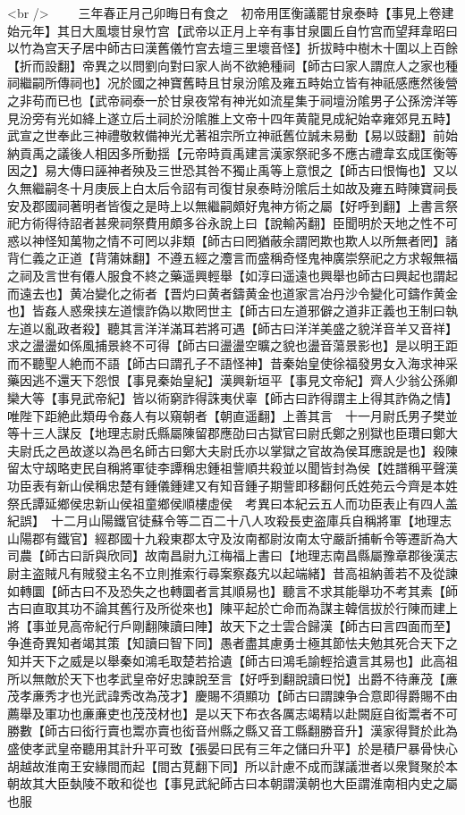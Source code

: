<br />
　　三年春正月己卯晦日有食之　初帝用匡衡議罷甘泉泰畤【事見上卷建始元年】其日大風壞甘泉竹宫【武帝以正月上辛有事甘泉圜丘自竹宫而望拜韋昭曰以竹為宫天子居中師古曰漢舊儀竹宫去壇三里壞音怪】折拔畤中樹木十圍以上百餘【折而設翻】帝異之以問劉向對曰家人尚不欲絶種祠【師古曰家人謂庶人之家也種祠繼嗣所傳祠也】况於國之神寶舊畤且甘泉汾隂及雍五畤始立皆有神祇感應然後營之非苟而已也【武帝祠泰一於甘泉夜常有神光如流星集于祠壇汾隂男子公孫滂洋等見汾旁有光如絳上遂立后土祠於汾隂脽上文帝十四年黄龍見成紀始幸雍郊見五畤】武宣之世奉此三神禮敬敕備神光尤著祖宗所立神祇舊位誠未易動【易以豉翻】前始納貢禹之議後人相因多所動揺【元帝時貢禹建言漢家祭祀多不應古禮韋玄成匡衡等因之】易大傳曰誣神者殃及三世恐其咎不獨止禹等上意恨之【師古曰恨悔也】又以久無繼嗣冬十月庚辰上白太后令詔有司復甘泉泰畤汾隂后土如故及雍五畤陳寶祠長安及郡國祠著明者皆復之是時上以無繼嗣頗好鬼神方術之屬【好呼到翻】上書言祭祀方術得待詔者甚衆祠祭費用頗多谷永說上曰【說輸芮翻】臣聞明於天地之性不可惑以神怪知萬物之情不可罔以非類【師古曰罔猶蔽余謂罔欺也欺人以所無者罔】諸背仁義之正道【背蒲妺翻】不遵五經之灋言而盛稱奇怪鬼神廣崇祭祀之方求報無福之祠及言世有僊人服食不終之藥遥興輕舉【如淳曰遥遠也興舉也師古曰興起也謂起而遠去也】黄冶變化之術者【晋灼曰黄者鑄黄金也道家言冶丹沙令變化可鑄作黄金也】皆姦人惑衆挟左道懷詐偽以欺罔世主【師古曰左道邪僻之道非正義也王制曰執左道以亂政者殺】聽其言洋洋滿耳若將可遇【師古曰洋洋美盛之貌洋音羊又音祥】求之盪盪如係風捕景終不可得【師古曰盪盪空曠之貌也盪音蕩景影也】是以明王距而不聽聖人絶而不語【師古曰謂孔子不語怪神】昔秦始皇使徐福發男女入海求神采藥因逃不還天下怨恨【事見秦始皇紀】漢興新垣平【事見文帝紀】齊人少翁公孫卿欒大等【事見武帝紀】皆以術窮詐得誅夷伏辜【師古曰詐得謂主上得其詐偽之情】唯陛下距絶此類毋令姦人有以窺朝者【朝直遥翻】上善其言　十一月尉氏男子樊並等十三人謀反【地理志尉氏縣屬陳留郡應劭曰古獄官曰尉氏鄭之别獄也臣瓚曰鄭大夫尉氏之邑故遂以為邑名師古曰鄭大夫尉氏亦以掌獄之官故為侯耳應說是也】殺陳留太守刼略吏民自稱將軍徒李譚稱忠鍾祖訾順共殺並以聞皆封為侯【姓譜稱平聲漢功臣表有新山侯稱忠楚有鍾儀鍾建又有知音鍾子期訾即移翻何氏姓苑云今齊是本姓祭氏譚延鄉侯忠新山侯祖童鄉侯順樓虛侯　考異曰本紀云五人而功臣表止有四人盖紀誤】　十二月山陽鐵官徒蘇令等二百二十八人攻殺長吏盗庫兵自稱將軍【地理志山陽郡有鐵官】經郡國十九殺東郡太守及汝南都尉汝南太守嚴訢捕斬令等遷訢為大司農【師古曰訢與欣同】故南昌尉九江梅福上書曰【地理志南昌縣屬豫章郡後漢志尉主盗賊凡有賊發主名不立則推索行尋案察姦宄以起端緒】昔高祖納善若不及從諫如轉圜【師古曰不及恐失之也轉圜者言其順易也】聽言不求其能舉功不考其素【師古曰直取其功不論其舊行及所從來也】陳平起於亡命而為謀主韓信拔於行陳而建上將【事並見高帝紀行戶剛翻陳讀曰陣】故天下之士雲合歸漢【師古曰言四面而至】争進奇異知者竭其策【知讀曰智下同】愚者盡其慮勇士極其節怯夫勉其死合天下之知并天下之威是以舉秦如鴻毛取楚若拾遺【師古曰鴻毛諭輕拾遺言其易也】此高祖所以無敵於天下也孝武皇帝好忠諫說至言【好呼到翻說讀曰悦】出爵不待亷茂【亷茂孝亷秀才也光武諱秀改為茂才】慶賜不須顯功【師古曰謂諫争合意即得爵賜不由薦舉及軍功也亷亷吏也茂茂材也】是以天下布衣各厲志竭精以赴闕庭自衒鬻者不可勝數【師古曰衒行賣也鬻亦賣也衒音州縣之縣又音工縣翻勝音升】漢家得賢於此為盛使孝武皇帝聽用其計升平可致【張晏曰民有三年之儲曰升平】於是積尸暴骨快心胡越故淮南王安緣間而起【間古莧翻下同】所以計慮不成而謀議泄者以衆賢聚於本朝故其大臣埶陵不敢和從也【事見武紀師古曰本朝謂漢朝也大臣謂淮南相内史之屬也服